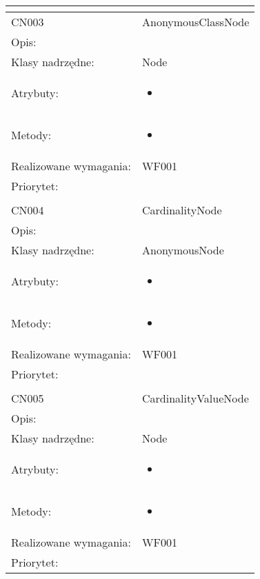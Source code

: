 \documentclass[a4paper,10pt]{article}
\begin{document}
\begin{center}
\begin{longtable}{|m{3cm}|m{9cm}|}
\multicolumn{2}{c}{} \\
 \hline

CN003 & AnonymousClassNode \\ \hline
Opis: &     \\ \hline
Klasy nadrzędne: & Node     \\ \hline
Atrybuty: & \begin{itemize}
 \item 
\end{itemize}
 \\ \hline
Metody: & \begin{itemize}
 \item 
\end{itemize}
  \\ \hline
Realizowane wymagania: & WF001 \\ \hline
Priorytet: &  \\ \hline

\multicolumn{2}{c}{} \\
 \hline

CN004 & CardinalityNode \\ \hline
Opis: &     \\ \hline
Klasy nadrzędne: & AnonymousNode     \\ \hline
Atrybuty: & \begin{itemize}
 \item 
\end{itemize}
 \\ \hline
Metody: & \begin{itemize}
 \item 
\end{itemize}
  \\ \hline
Realizowane wymagania: & WF001 \\ \hline
Priorytet: &  \\ \hline

\multicolumn{2}{c}{} \\
 \hline

CN005 & CardinalityValueNode \\ \hline
Opis: &     \\ \hline
Klasy nadrzędne: & Node     \\ \hline
Atrybuty: & \begin{itemize}
 \item 
\end{itemize}
 \\ \hline
Metody: & \begin{itemize}
 \item 
\end{itemize}
  \\ \hline
Realizowane wymagania: & WF001 \\ \hline
Priorytet: &  \\ \hline


\end{longtable}
\end{center}
\end{document}
